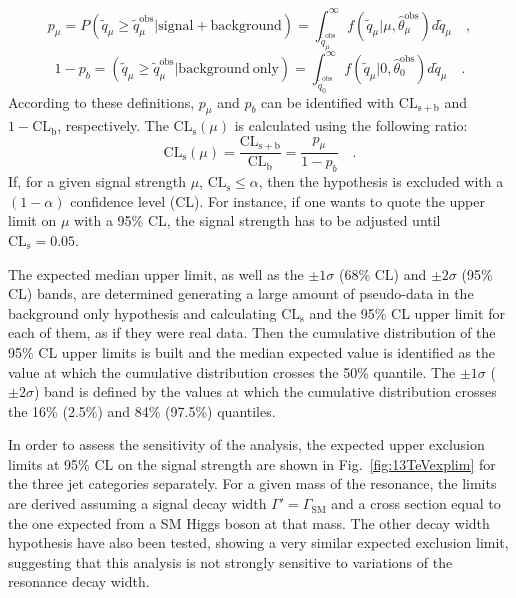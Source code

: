 \begin{equation}
p_\mu = P(\tilde{q}_\mu \geq \tilde{q}_\mu^\mathrm{obs}|\mathrm{signal+background}) = \int_{\tilde{q}_\mu^\mathrm{obs}}^{\infty} f(\tilde{q}_\mu|\mu,\hat{\theta}_\mu^\mathrm{obs}) d\tilde{q}_\mu \quad ,
\end{equation}
\begin{equation}
1 - p_b = (\tilde{q}_\mu \geq \tilde{q}_\mu^\mathrm{obs}|\mathrm{background~only}) = \int_{\tilde{q}_0^\mathrm{obs}}^{\infty} f(\tilde{q}_\mu|0,\hat{\theta}_0^\mathrm{obs}) d\tilde{q}_\mu \quad .
\end{equation}
According to these definitions, $p_\mu$ and $p_b$ can be identified with $\mathrm{CL_{s+b}}$ and $1-\mathrm{CL_b}$, respectively.
The $\mathrm{CL_s}(\mu)$ is calculated using the following ratio:
\begin{equation}
\mathrm{CL_s}(\mu) = \frac{\mathrm{CL_{s+b}}}{\mathrm{CL_b}} = \frac{p_\mu}{1-p_b} \quad .
\end{equation}
If, for a given signal strength $\mu$, $\mathrm{CL_s} \leq \alpha$, then the hypothesis is excluded with a $(1-\alpha)$ confidence level (CL). For instance, if one wants to quote the upper limit on $\mu$ with a 95\% CL, the signal strength has to be adjusted until $\mathrm{CL_s} = 0.05$.

The expected median upper limit, as well as the $\pm 1\sigma$ (68\% CL) and $\pm 2\sigma$ (95\% CL) bands, are determined generating a large amount of pseudo-data in the background only hypothesis and calculating $\mathrm{CL_s}$ and the 95\% CL upper limit for each of them, as if they were real data. Then the cumulative distribution of the 95\% CL upper limits is built and the median expected value is identified as the value at which the cumulative distribution crosses the 50\% quantile. The $\pm 1\sigma$ ($\pm 2 \sigma$) band is defined by the values at which the cumulative distribution crosses the 16\% (2.5\%) and 84\% (97.5\%) quantiles.

In order to assess the sensitivity of the analysis, the expected upper exclusion limits at 95\% CL on the signal strength are shown in Fig.~\ref{fig:13TeVexplim} for the three jet categories separately. For a given mass of the resonance, the limits are derived assuming a signal decay width $\Gamma' = \Gamma_\mathrm{SM}$ and a cross section equal to the one expected from a SM Higgs boson at that mass. The other decay width hypothesis have also been tested, showing a very similar expected exclusion limit, suggesting that this analysis is not strongly sensitive to variations of the resonance decay width.

